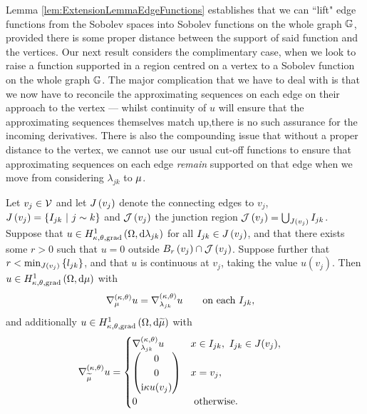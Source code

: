 Lemma \ref{lem:ExtensionLemmaEdgeFunctions} establishes that we can ``lift" edge functions from the Sobolev spaces into Sobolev functions on the whole graph $\mathbb{G}$, provided there is some proper distance between the support of said function and the vertices.
Our next result considers the complimentary case, when we look to raise a function supported in a region centred on a vertex to a Sobolev function on the whole graph $\mathbb{G}$.
The major complication that we have to deal with is that we now have to reconcile the approximating sequences on each edge on their approach to the vertex --- whilst continuity of $u$ will ensure that the approximating sequences themselves match up,there is no such assurance for the incoming derivatives.
There is also the compounding issue that without a proper distance to the vertex, we cannot use our usual cut-off functions to ensure that approximating sequences on each edge \emph{remain} supported on that edge when we move from considering $\lambda_{jk}$ to $\mu$.
\begin{lemma} \label{lem:ExtensionLemmaVertexFunctions}
	Let $v_j\in\mathcal{V}$ and let $J\left( v_j \right)$ denote the connecting edges to $v_j$, $J\left( v_j \right) = \left\{ I_{jk} \ \middle\vert \  j\sim k \right\}$ and $\mathcal{J}\left( v_j \right)$ the junction region $\mathcal{J}\left( v_j \right)=\bigcup_{J(v_j)}I_{jk}$.
	Suppose that $u\in H^1_{\kappa,\theta,\mathrm{grad}}\left( \Omega, \mathrm{d}\lambda_{jk} \right)$ for all $I_{jk}\in J\left( v_j \right)$, and that there exists some $r>0$ such that $u=0$ outside $B_r\left( v_j \right)\cap \mathcal{J}\left( v_j \right)$.
	Suppose further that $r<\min_{J\left( v_j \right)}\left\{ l_{jk} \right\}$, and that $u$ is continuous at $v_j$, taking the value $u(v_j)$.
	Then $u\in H^1_{\kappa,\theta,\mathrm{grad}}\left( \Omega, \mathrm{d}\mu \right)$ with
	\begin{align*}
		\nabla^{\left( \kappa, \theta \right)}_{\mu}u &= \nabla^{\left( \kappa, \theta \right)}_{\lambda_{jk}}u \qquad\text{on each } I_{jk},
	\end{align*}
	and additionally $u\in H^1_{\kappa,\theta,\mathrm{grad}}\left( \Omega, \mathrm{d}\widetilde{\mu} \right)$ with
	\begin{align*}
		\nabla^{\left( \kappa, \theta \right)}_{\widetilde{\mu}}u &= 
		\begin{cases}
			\nabla^{\left( \kappa, \theta \right)}_{\lambda_{jk}}u & x\in I_{jk}, \ I_{jk}\in J(v_j), \\
			\begin{pmatrix} 0 \\ 0 \\ \mathrm{i}\kappa u(v_j) \end{pmatrix} & x=v_j, \\
			0 & \text{ otherwise}.
		\end{cases}
	\end{align*}
\end{lemma}
